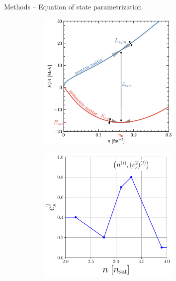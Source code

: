 \documentclass[usenames,dvipsnames,t]{beamer}
\begin{document}
\begin{frame}{Methods -- Equation of state parametrization}
  \begin{figure}
    \centering
    \begin{subfigure}[b]{0.475\textwidth}
        \centering
        \includegraphics[width=0.75\textwidth]{Figures/metamodel_frank.jpg}
    \end{subfigure}
    \hfill
    \begin{subfigure}[b]{0.475\textwidth}
        \centering
        \includegraphics[width=0.75\textwidth]{Figures/cs2_sketch.pdf}
    \end{subfigure}
\end{figure}


\end{frame}
\end{document}
